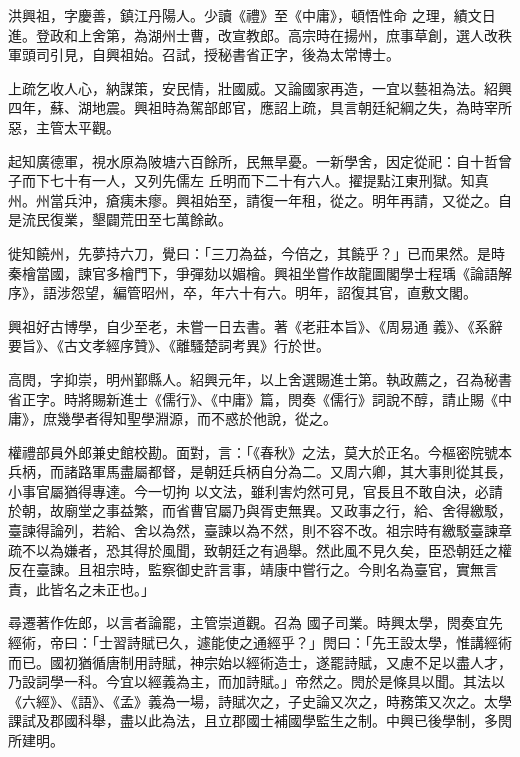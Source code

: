 \begin{pinyinscope}
 洪興祖，字慶善，鎮江丹陽人。少讀《禮》至《中庸》，頓悟性命
 之理，績文日進。登政和上舍第，為湖州士曹，改宣教郎。高宗時在揚州，庶事草創，選人改秩軍頭司引見，自興祖始。召試，授秘書省正字，後為太常博士。



 上疏乞收人心，納謀策，安民情，壯國威。又論國家再造，一宜以藝祖為法。紹興四年，蘇、湖地震。興祖時為駕部郎官，應詔上疏，具言朝廷紀綱之失，為時宰所惡，主管太平觀。



 起知廣德軍，視水原為陂塘六百餘所，民無旱憂。一新學舍，因定從祀：自十哲曾子而下七十有一人，又列先儒左
 丘明而下二十有六人。擢提點江東刑獄。知真州。州當兵沖，瘡痍未瘳。興祖始至，請復一年租，從之。明年再請，又從之。自是流民復業，墾闢荒田至七萬餘畝。



 徙知饒州，先夢持六刀，覺曰：「三刀為益，今倍之，其饒乎？」已而果然。是時秦檜當國，諫官多檜門下，爭彈劾以媚檜。興祖坐嘗作故龍圖閣學士程瑀《論語解序》，語涉怨望，編管昭州，卒，年六十有六。明年，詔復其官，直敷文閣。



 興祖好古博學，自少至老，未嘗一日去書。著《老莊本旨》、《周易通
 義》、《系辭要旨》、《古文孝經序贊》、《離騷楚詞考異》行於世。



 高閌，字抑崇，明州鄞縣人。紹興元年，以上舍選賜進士第。執政薦之，召為秘書省正字。時將賜新進士《儒行》、《中庸》篇，閌奏《儒行》詞說不醇，請止賜《中庸》，庶幾學者得知聖學淵源，而不惑於他說，從之。



 權禮部員外郎兼史館校勘。面對，言：「《春秋》之法，莫大於正名。今樞密院號本兵柄，而諸路軍馬盡屬都督，是朝廷兵柄自分為二。又周六卿，其大事則從其長，小事官屬猶得專達。今一切拘
 以文法，雖利害灼然可見，官長且不敢自決，必請於朝，故廟堂之事益繁，而省曹官屬乃與胥吏無異。又政事之行，給、舍得繳駁，臺諫得論列，若給、舍以為然，臺諫以為不然，則不容不改。祖宗時有繳駁臺諫章疏不以為嫌者，恐其得於風聞，致朝廷之有過舉。然此風不見久矣，臣恐朝廷之權反在臺諫。且祖宗時，監察御史許言事，靖康中嘗行之。今則名為臺官，實無言責，此皆名之未正也。」



 尋遷著作佐郎，以言者論罷，主管崇道觀。召為
 國子司業。時興太學，閌奏宜先經術，帝曰：「士習詩賦已久，遽能使之通經乎？」閌曰：「先王設太學，惟講經術而已。國初猶循唐制用詩賦，神宗始以經術造士，遂罷詩賦，又慮不足以盡人才，乃設詞學一科。今宜以經義為主，而加詩賦。」帝然之。閌於是條具以聞。其法以《六經》、《語》、《孟》義為一場，詩賦次之，子史論又次之，時務策又次之。太學課試及郡國科舉，盡以此為法，且立郡國士補國學監生之制。中興已後學制，多閌所建明。




\end{pinyinscope}
